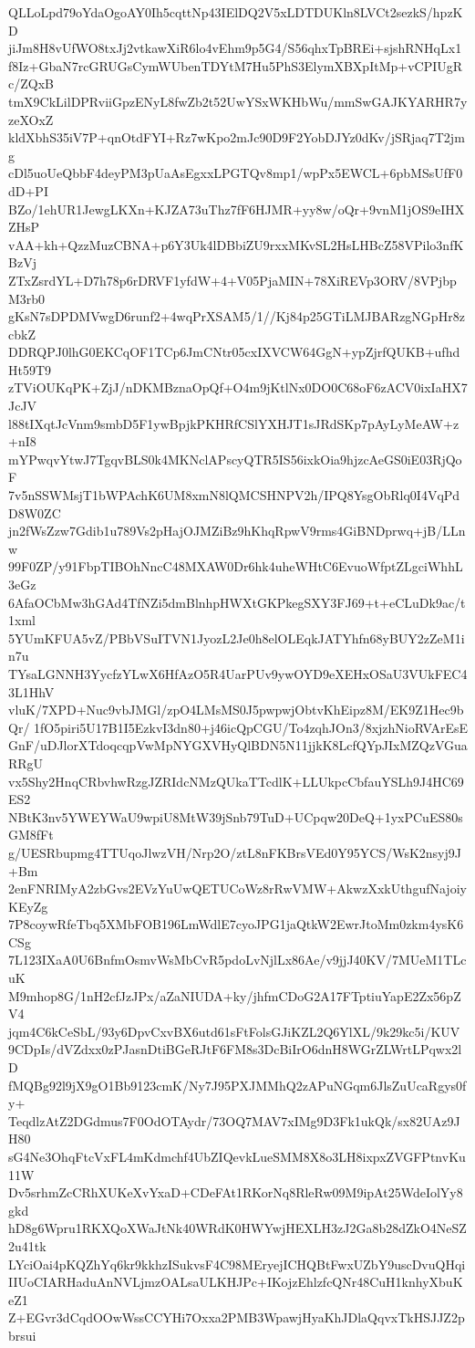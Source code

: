 QLLoLpd79oYdaOgoAY0Ih5cqttNp43IElDQ2V5xLDTDUKln8LVCt2sezkS/hpzKD
jiJm8H8vUfWO8txJj2vtkawXiR6lo4vEhm9p5G4/S56qhxTpBREi+sjshRNHqLx1
f8Iz+GbaN7rcGRUGsCymWUbenTDYtM7Hu5PhS3ElymXBXpItMp+vCPIUgRc/ZQxB
tmX9CkLilDPRviiGpzENyL8fwZb2t52UwYSxWKHbWu/mmSwGAJKYARHR7yzeXOxZ
kldXbhS35iV7P+qnOtdFYI+Rz7wKpo2mJc90D9F2YobDJYz0dKv/jSRjaq7T2jmg
cDl5uoUeQbbF4deyPM3pUaAsEgxxLPGTQv8mp1/wpPx5EWCL+6pbMSsUfF0dD+PI
BZo/1ehUR1JewgLKXn+KJZA73uThz7fF6HJMR+yy8w/oQr+9vnM1jOS9eIHXZHsP
vAA+kh+QzzMuzCBNA+p6Y3Uk4lDBbiZU9rxxMKvSL2HsLHBcZ58VPilo3nfKBzVj
ZTxZsrdYL+D7h78p6rDRVF1yfdW+4+V05PjaMIN+78XiREVp3ORV/8VPjbpM3rb0
gKsN7sDPDMVwgD6runf2+4wqPrXSAM5/1//Kj84p25GTiLMJBARzgNGpHr8zcbkZ
DDRQPJ0lhG0EKCqOF1TCp6JmCNtr05cxIXVCW64GgN+ypZjrfQUKB+ufhdHt59T9
zTViOUKqPK+ZjJ/nDKMBznaOpQf+O4m9jKtlNx0DO0C68oF6zACV0ixIaHX7JcJV
l88tIXqtJcVnm9smbD5F1ywBpjkPKHRfCSlYXHJT1sJRdSKp7pAyLyMeAW+z+nI8
mYPwqvYtwJ7TgqvBLS0k4MKNclAPscyQTR5IS56ixkOia9hjzcAeGS0iE03RjQoF
7v5nSSWMsjT1bWPAchK6UM8xmN8lQMCSHNPV2h/IPQ8YsgObRlq0I4VqPdD8W0ZC
jn2fWsZzw7Gdib1u789Vs2pHajOJMZiBz9hKhqRpwV9rms4GiBNDprwq+jB/LLnw
99F0ZP/y91FbpTIBOhNncC48MXAW0Dr6hk4uheWHtC6EvuoWfptZLgciWhhL3eGz
6AfaOCbMw3hGAd4TfNZi5dmBlnhpHWXtGKPkegSXY3FJ69+t+eCLuDk9ac/t1xml
5YUmKFUA5vZ/PBbVSuITVN1JyozL2Je0h8elOLEqkJATYhfn68yBUY2zZeM1in7u
TYsaLGNNH3YycfzYLwX6HfAzO5R4UarPUv9ywOYD9eXEHxOSaU3VUkFEC43L1HhV
vluK/7XPD+Nuc9vbJMGl/zpO4LMsMS0J5pwpwjObtvKhEipz8M/EK9Z1Hec9bQr/
1fO5piri5U17B1I5EzkvI3dn80+j46icQpCGU/To4zqhJOn3/8xjzhNioRVArEsE
GnF/uDJlorXTdoqcqpVwMpNYGXVHyQlBDN5N11jjkK8LcfQYpJIxMZQzVGuaRRgU
vx5Shy2HnqCRbvhwRzgJZRIdcNMzQUkaTTcdlK+LLUkpcCbfauYSLh9J4HC69ES2
NBtK3nv5YWEYWaU9wpiU8MtW39jSnb79TuD+UCpqw20DeQ+1yxPCuES80sGM8fFt
g/UESRbupmg4TTUqoJlwzVH/Nrp2O/ztL8nFKBrsVEd0Y95YCS/WsK2nsyj9J+Bm
2enFNRIMyA2zbGvs2EVzYuUwQETUCoWz8rRwVMW+AkwzXxkUthgufNajoiyKEyZg
7P8coywRfeTbq5XMbFOB196LmWdlE7cyoJPG1jaQtkW2EwrJtoMm0zkm4ysK6CSg
7L123IXaA0U6BnfmOsmvWsMbCvR5pdoLvNjlLx86Ae/v9jjJ40KV/7MUeM1TLcuK
M9mhop8G/1nH2cfJzJPx/aZaNIUDA+ky/jhfmCDoG2A17FTptiuYapE2Zx56pZV4
jqm4C6kCeSbL/93y6DpvCxvBX6utd61sFtFolsGJiKZL2Q6YlXL/9k29kc5i/KUV
9CDpIs/dVZdxx0zPJasnDtiBGeRJtF6FM8s3DcBiIrO6dnH8WGrZLWrtLPqwx2lD
fMQBg92l9jX9gO1Bb9123cmK/Ny7J95PXJMMhQ2zAPuNGqm6JlsZuUcaRgys0fy+
TeqdlzAtZ2DGdmus7F0OdOTAydr/73OQ7MAV7xIMg9D3Fk1ukQk/sx82UAz9JH80
sG4Ne3OhqFtcVxFL4mKdmchf4UbZIQevkLueSMM8X8o3LH8ixpxZVGFPtnvKu11W
Dv5srhmZcCRhXUKeXvYxaD+CDeFAt1RKorNq8RleRw09M9ipAt25WdeIolYy8gkd
hD8g6Wpru1RKXQoXWaJtNk40WRdK0HWYwjHEXLH3zJ2Ga8b28dZkO4NeSZ2u41tk
LYciOai4pKQZhYq6kr9kkhzISukvsF4C98MEryejICHQBtFwxUZbY9uscDvuQHqi
IIUoCIARHaduAnNVLjmzOALsaULKHJPc+IKojzEhlzfcQNr48CuH1knhyXbuKeZ1
Z+EGvr3dCqdOOwWssCCYHi7Oxxa2PMB3WpawjHyaKhJDlaQqvxTkHSJJZ2pbrsui
